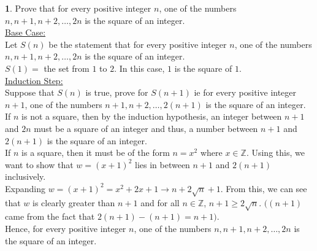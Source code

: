 \documentclass[12pt,a4paper]{article}
\newcommand{\Z}{\mathbb{Z}}
\theoremstyle{definition}
\newtheorem{problem}{}
\begin{document}
\begin{problem}
Prove that for every positive integer $n$, one of the numbers $n, n+1, n+2, \ldots , 2n$ is the square of an integer. \\

\underline{Base Case:} \\
Let $S(n)$ be the statement that for every positive integer $n$, one of the numbers $n, n+1, n+2, \ldots , 2n$ is the square of an integer.\\
$S(1) =$ the set from $1$ to $2$. In this case, $1$ is the square of $1$.\\

\underline{Induction Step:} \\
Suppose that $S(n)$ is true, prove for $S(n + 1)$ ie for every positive integer $n + 1$, one of the numbers $n + 1, n + 2, \ldots, 2(n + 1)$ is the square of an integer. \\

If $n$ is not a square, then by the induction hypothesis, an integer between $n + 1$ and $2n$ must be a square of an integer and thus, a number between $n + 1$ and $2(n + 1)$ is the square of an integer. \\

If $n$ is a square, then it must be of the form $n = x^2$ where $x \in \Z$. Using this, we want to show that $w = (x + 1)^2$ lies in between $n + 1$ and $2(n + 1)$ inclusively. \\

Expanding $w = (x + 1)^2 = x^2 + 2x + 1 \rightarrow n + 2\sqrt{n} + 1$. From this, we can see that $w$ is clearly greater than $n + 1$ and for all $n \in \Z$, $n + 1 \geq 2\sqrt{n}$. $((n + 1)$ came from the fact that $2(n + 1) - (n + 1) = n + 1)$. \\

Hence, for every positive integer $n$, one of the numbers $n, n+1, n+2, \ldots , 2n$ is the square of an integer. \\\\\\\\

\end{problem}
\end{document}
